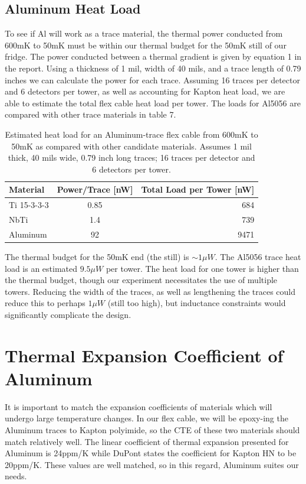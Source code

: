 \documentclass{report}
\begin{document}
\subsection{Aluminum Heat Load}

To see if Al will work as a trace material, the thermal power conducted from 600mK to 50mK must be within our thermal budget for the 50mK still of our fridge. The power conducted between a thermal gradient is given by equation 1 in the report. Using a thickness of 1 mil, width of 40 mils, and a trace length of 0.79 inches we can calculate the power for each trace. Assuming 16 traces per detector and 6 detectors per tower, as well as accounting for Kapton heat load, we are able to estimate the total flex cable heat load per tower. The loads for Al5056 are compared with other trace materials in table 7.


\begin{table}
\begin{threeparttable}
\begin{tabular}{l|c|r}
\toprule
Material & Power/Trace [nW] & Total Load per Tower [nW] \\
\midrule
Ti 15-3-3-3 & 0.85 & 684 \\
NbTi & 1.4 & 739 \\
Aluminum & 92 & 9471 \\
\bottomrule
\end{tabular}
\end{threeparttable}
\caption{Estimated heat load for an Aluminum-trace flex cable from 600mK to 50mK as compared with other candidate materials. Assumes 1 mil thick, 40 mils wide, 0.79 inch long traces; 16 traces per detector and 6 detectors per tower.}
\end{table}

The thermal budget for the 50mK end (the still) is $\sim 1 \mu W$. The Al5056 trace heat load is an estimated $9.5 \mu W$ per tower. The heat load for one tower is higher than the thermal budget, though our experiment necessitates the use of multiple towers. Reducing the width of the traces, as well as lengthening the traces could reduce this to perhaps $1\mu W$ (still too high), but inductance constraints would significantly complicate the design.


\section{Thermal Expansion Coefficient of Aluminum}
It is important to match the expansion coefficients of materials which will undergo large temperature changes. In our flex cable, we will be epoxy-ing the Aluminum traces to Kapton polyimide, so the CTE of these two materials should match relatively well. The linear coefficient of thermal expansion presented for Aluminum is 24ppm/K while DuPont states the coefficient for Kapton HN to be 20ppm/K. These values are well matched, so in this regard, Aluminum suites our needs.
\end{document}
